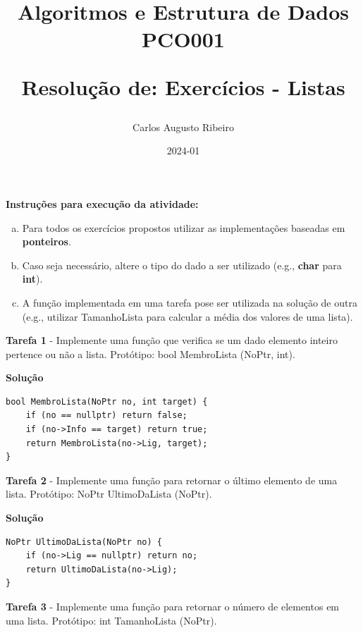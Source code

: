 \documentclass{article}
\title{
    Algoritmos e Estrutura de Dados PCO001
    
    Resolução de: \textbf{Exercícios - Listas}
}
\author{Carlos Augusto Ribeiro}
\date{2024-01}
\begin{document}
    
\maketitle


\par
\noindent
\begin{center}
    \textbf{Instruções para execução da atividade:}
\end{center}
\begin{enumerate}[(a)]
    \item Para todos os exercícios propostos utilizar as implementações baseadas em \textbf{ponteiros}.
    \item Caso seja necessário, altere o tipo do dado a ser utilizado (e.g., \textbf{char} para \textbf{int}).
    \item A função implementada em uma tarefa pose ser utilizada na solução de outra (e.g., utilizar TamanhoLista para calcular a média dos valores de uma lista).
\end{enumerate}

\par
\noindent
\textbf{Tarefa 1} - Implemente uma função que verifica se um dado elemento inteiro pertence ou não a lista.
Protótipo: bool MembroLista (NoPtr, int).

\bigskip
\par
\noindent
\textbf{Solução}
\begin{lstlisting}
bool MembroLista(NoPtr no, int target) {
    if (no == nullptr) return false;
    if (no->Info == target) return true;
    return MembroLista(no->Lig, target);
}
\end{lstlisting}

\bigskip

\par
\noindent
\textbf{Tarefa 2}  - Implemente uma função para retornar o último elemento de uma lista.
Protótipo: NoPtr UltimoDaLista (NoPtr).

\bigskip
\par
\noindent
\textbf{Solução}
\begin{lstlisting}
NoPtr UltimoDaLista(NoPtr no) {
    if (no->Lig == nullptr) return no;
    return UltimoDaLista(no->Lig);
}
\end{lstlisting}

\bigskip

\par
\noindent
\textbf{Tarefa 3}  - Implemente uma função para retornar o número de elementos em uma lista.
Protótipo: int TamanhoLista (NoPtr).
\end{document}
